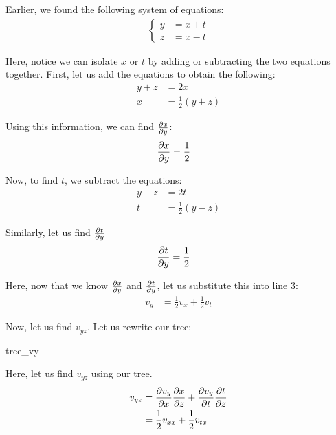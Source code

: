 Earlier, we found the following system of equations:
\begin{align}
  \begin{cases}
    y & = x + t\\
    z & = x - t
  \end{cases}
\end{align}

Here, notice we can isolate $x$ or $t$ by adding or subtracting
the two equations together. First, let us add the equations to
obtain the following:
%
\begin{align}
  y + z & = 2x\\
  x & = \frac{1}{2}(y + z)
\end{align}

Using this information, we can find $\frac{\partial x}{\partial y}$:
%
\begin{align}
  \frac{\partial x}{\partial y} & = \frac{1}{2}
\end{align}

Now, to find $t$, we subtract the equations:
%
\begin{align}
  y - z & = 2t\\
  t & = \frac{1}{2}(y - z)
\end{align}

Similarly, let us find $\frac{\partial t}{\partial y}$
%
\begin{align}
  \frac{\partial t}{\partial y} & = \frac{1}{2}
\end{align}

Here, now that we know $\frac{\partial x}{\partial y}$ and $\frac{\partial t}{\partial y}$, let us substitute this into line 3:
%
\begin{align}
  v_y & = \frac{1}{2} v_x + \frac{1}{2} v_t
\end{align}

Now, let us find $v_{yz}$. Let us rewrite our tree:
\begin{center}
  {tree_vy}
\end{center}

Here, let us find $v_{yz}$ using our tree.
%
\begin{align}
  v_{yz} & = \frac{\partial v_y}{\partial x} \frac{\partial x}{\partial z} + \frac{\partial v_y}{\partial t} \frac{\partial t}{\partial z}\\
  & = \frac{1}{2} v_{xx} + \frac{1}{2} v_{tx}
\end{align}

